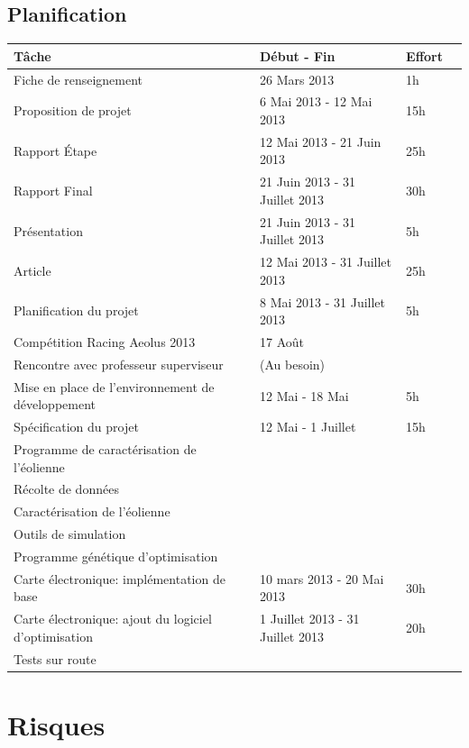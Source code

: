 \documentclass[11pt]{article}
\begin{document}
\subsection{Planification}

\begin{tabu} to \linewidth {Xlll}
  \bfseries Tâche & Début - Fin & Effort\\ \hline
  Fiche de renseignement  & 26 Mars 2013 & 1h \\
  Proposition de projet   & 6 Mai 2013 - 12 Mai 2013 & 15h \\
  Rapport Étape           & 12 Mai 2013 - 21 Juin 2013 & 25h\\
  Rapport Final           & 21 Juin 2013 - 31 Juillet 2013 & 30h\\
  Présentation            & 21 Juin 2013 - 31 Juillet 2013 & 5h \\
  Article                 & 12 Mai 2013 - 31 Juillet 2013  & 25h\\
  Planification du projet & 8 Mai 2013 - 31 Juillet 2013   & 5h\\
  Compétition Racing Aeolus 2013 & 17 Août & \\
  \hline
  Rencontre avec professeur superviseur & (Au besoin) & \\
  \hline
  Mise en place de l'environnement de développement & 12 Mai - 18 Mai & 5h \\
  Spécification du projet & 12 Mai - 1 Juillet & 15h \\
  \hline
  Programme de caractérisation de l'éolienne & & \\
  Récolte de données                         & & \\
  Caractérisation de l'éolienne              & & \\
  \hline
  Outils de simulation                   & & \\
  Programme génétique d'optimisation    & & \\
  \hline
  Carte électronique: implémentation de base    & 10 mars 2013 - 20 Mai 2013 & 30h \\
  Carte électronique: ajout du logiciel d'optimisation & 1 Juillet 2013 - 31 Juillet 2013 & 20h \\
  \hline
  Tests sur route & & \\
  \hline
\end{tabu}

\section{Risques}
\end{document}
